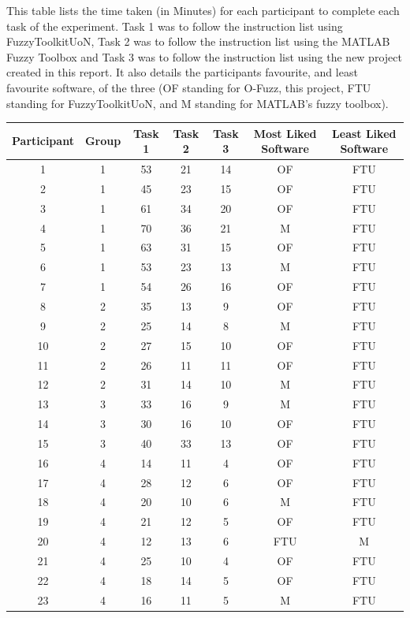 \noindent 
This table lists the time taken (in Minutes) for each participant to complete each task of the experiment. Task 1 was to follow the instruction list using FuzzyToolkitUoN, Task 2 was to follow the instruction list using the MATLAB Fuzzy Toolbox and Task 3 was to follow the instruction list using the new project created in this report. It also details the participants favourite, and least favourite software, of the three (OF standing for O-Fuzz, this project, FTU standing for FuzzyToolkitUoN, and M standing for MATLAB's fuzzy toolbox).\ \\
\begin{changemargin}{-1cm}{-1cm}
\begin{tabular}{ccccccc}
\hline
Participant	&	Group	&	Task 1	&	Task 2	&	Task 3	&	Most Liked Software	&	Least Liked Software 	\\
\hline
1			&	1		&	53		&	21		&	14		&	OF					&	FTU						\\	
2			&	1		&	45		&	23		&	15		&	OF					&	FTU						\\
3			&	1		&	61		&	34		&	20		&	OF					&	FTU						\\	
4			&	1		&	70		&	36		&	21		&	M					&	FTU						\\	
5			&	1		&	63		&	31		&	15		&	OF					&	FTU						\\		
6			&	1		&	53		&	23		&	13		&	M					&	FTU						\\	
7			&	1		&	54		&	26		&	16		&	OF					&	FTU						\\	
8			&	2		&	35		&	13		&	9		&	OF					&	FTU						\\		
9			&	2		&	25		&	14		&	8		&	M					&	FTU						\\	
10			&	2		&	27		&	15		&	10		&	OF					&	FTU						\\			
11			&	2		&	26		&	11		&	11		&	OF					&	FTU						\\		
12			&	2		&	31		&	14		&	10		&	M					&	FTU						\\		
13			&	3		&	33		&	16		&	9		&	M					&	FTU						\\	
14			&	3		&	30		&	16		&	10		&	OF					&	FTU						\\			
15			&	3		&	40		&	33		&	13		&	OF					&	FTU						\\			
16			&	4		&	14		&	11		&	4 		&	OF					&	FTU						\\		
17			&	4		&	28		&	12		&	6 		&	OF					&	FTU						\\			
18			&	4		&	20		&	10		&	6 		&	M					&	FTU						\\	
19			&	4		&	21		&	12		&	5 		&	OF					&	FTU						\\			
20			&	4		&	12		&	13		&	6 		&	FTU					&	M 						\\			
21			&	4		&	25		&	10		&	4 		&	OF					&	FTU						\\		
22			&	4 		&	18		&	14		&	5 		&	OF					&	FTU						\\
23			&	4 		&	16		&	11		&	5 		&	M					&	FTU						\\
\hline
\end{tabular}			
\end{changemargin}
\newpage 
